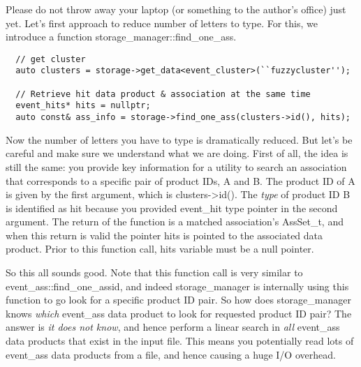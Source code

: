 Please do not throw away your laptop (or something to the author's office) just yet.
Let's first approach to reduce number of letters to type. For this, we introduce a function
{\ttfamily storage\_manager::find\_one\_ass}.
\begin{lstlisting}
  // get cluster
  auto clusters = storage->get_data<event_cluster>(``fuzzycluster''); 

  // Retrieve hit data product & association at the same time
  event_hits* hits = nullptr;
  auto const& ass_info = storage->find_one_ass(clusters->id(), hits);
\end{lstlisting}

Now the number of letters you have to type is dramatically reduced. But let's be careful
and make sure we understand what we are doing. First of all, the idea is still the same:
you provide key information for a utility to search an association that corresponds to
a specific pair of product IDs, A and B. The product ID of A is given by the first
argument, which is {\ttfamily clusters->id()}. The {\it type} of product ID B is identified
as {\ttfamily hit} because you provided {\ttfamily event\_hit} type pointer in the second
argument. The return of the function is a matched association's {\ttfamily AssSet\_t}, and
when this return is valid the pointer {\ttfamily hits} is pointed to the associated data
product. Prior to this function call, {\ttfamily hits} variable must be a null pointer.

So this all sounds good. Note that this function call is very similar to
{\ttfamily event\_ass::find\_one\_assid}, and indeed {\ttfamily storage\_manager} is
internally using this function to go look for a specific product ID pair.
So how does {\ttfamily storage\_manager} knows {\it which} {\ttfamily event\_ass} data
product to look for requested product ID pair? The answer is {\it it does not know},
and hence perform a linear search in {\it all} {\ttfamily event\_ass} data products that
exist in the input file. This means you potentially read lots of {\ttfamily event\_ass}
data products from a file, and hence causing a huge I/O overhead.

